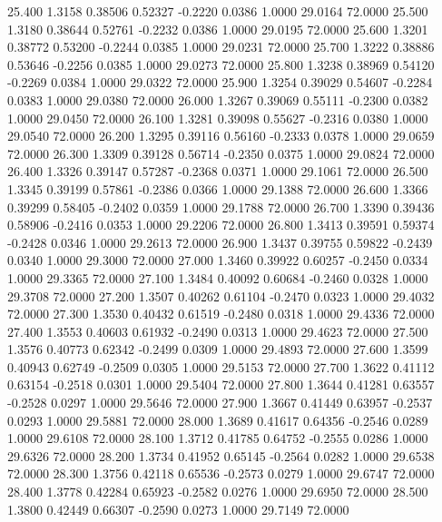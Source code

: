   25.400   1.3158   0.38506   0.52327  -0.2220   0.0386   1.0000  29.0164  72.0000
  25.500   1.3180   0.38644   0.52761  -0.2232   0.0386   1.0000  29.0195  72.0000
  25.600   1.3201   0.38772   0.53200  -0.2244   0.0385   1.0000  29.0231  72.0000
  25.700   1.3222   0.38886   0.53646  -0.2256   0.0385   1.0000  29.0273  72.0000
  25.800   1.3238   0.38969   0.54120  -0.2269   0.0384   1.0000  29.0322  72.0000
  25.900   1.3254   0.39029   0.54607  -0.2284   0.0383   1.0000  29.0380  72.0000
  26.000   1.3267   0.39069   0.55111  -0.2300   0.0382   1.0000  29.0450  72.0000
  26.100   1.3281   0.39098   0.55627  -0.2316   0.0380   1.0000  29.0540  72.0000
  26.200   1.3295   0.39116   0.56160  -0.2333   0.0378   1.0000  29.0659  72.0000
  26.300   1.3309   0.39128   0.56714  -0.2350   0.0375   1.0000  29.0824  72.0000
  26.400   1.3326   0.39147   0.57287  -0.2368   0.0371   1.0000  29.1061  72.0000
  26.500   1.3345   0.39199   0.57861  -0.2386   0.0366   1.0000  29.1388  72.0000
  26.600   1.3366   0.39299   0.58405  -0.2402   0.0359   1.0000  29.1788  72.0000
  26.700   1.3390   0.39436   0.58906  -0.2416   0.0353   1.0000  29.2206  72.0000
  26.800   1.3413   0.39591   0.59374  -0.2428   0.0346   1.0000  29.2613  72.0000
  26.900   1.3437   0.39755   0.59822  -0.2439   0.0340   1.0000  29.3000  72.0000
  27.000   1.3460   0.39922   0.60257  -0.2450   0.0334   1.0000  29.3365  72.0000
  27.100   1.3484   0.40092   0.60684  -0.2460   0.0328   1.0000  29.3708  72.0000
  27.200   1.3507   0.40262   0.61104  -0.2470   0.0323   1.0000  29.4032  72.0000
  27.300   1.3530   0.40432   0.61519  -0.2480   0.0318   1.0000  29.4336  72.0000
  27.400   1.3553   0.40603   0.61932  -0.2490   0.0313   1.0000  29.4623  72.0000
  27.500   1.3576   0.40773   0.62342  -0.2499   0.0309   1.0000  29.4893  72.0000
  27.600   1.3599   0.40943   0.62749  -0.2509   0.0305   1.0000  29.5153  72.0000
  27.700   1.3622   0.41112   0.63154  -0.2518   0.0301   1.0000  29.5404  72.0000
  27.800   1.3644   0.41281   0.63557  -0.2528   0.0297   1.0000  29.5646  72.0000
  27.900   1.3667   0.41449   0.63957  -0.2537   0.0293   1.0000  29.5881  72.0000
  28.000   1.3689   0.41617   0.64356  -0.2546   0.0289   1.0000  29.6108  72.0000
  28.100   1.3712   0.41785   0.64752  -0.2555   0.0286   1.0000  29.6326  72.0000
  28.200   1.3734   0.41952   0.65145  -0.2564   0.0282   1.0000  29.6538  72.0000
  28.300   1.3756   0.42118   0.65536  -0.2573   0.0279   1.0000  29.6747  72.0000
  28.400   1.3778   0.42284   0.65923  -0.2582   0.0276   1.0000  29.6950  72.0000
  28.500   1.3800   0.42449   0.66307  -0.2590   0.0273   1.0000  29.7149  72.0000
